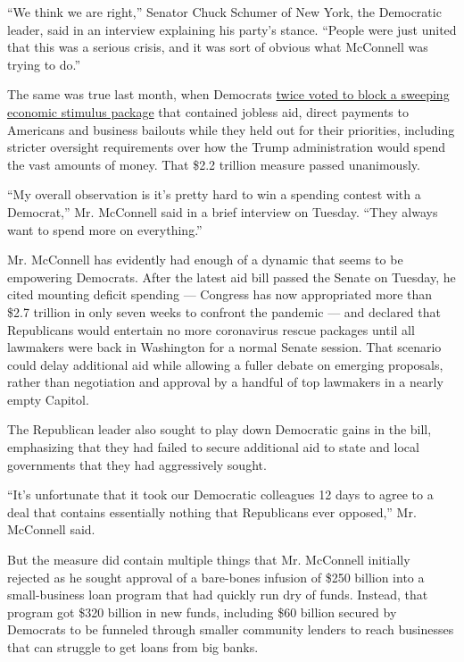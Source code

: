 ``We think we are right,'' Senator Chuck Schumer of New York, the
Democratic leader, said in an interview explaining his party's stance.
``People were just united that this was a serious crisis, and it was
sort of obvious what McConnell was trying to do.''

The same was true last month, when Democrats
\href{https://www.nytimes.com/2020/03/26/us/coronavirus-senate-stimulus-package.html}{twice
voted to block a sweeping economic stimulus package} that contained
jobless aid, direct payments to Americans and business bailouts while
they held out for their priorities, including stricter oversight
requirements over how the Trump administration would spend the vast
amounts of money. That \$2.2 trillion measure passed unanimously.

``My overall observation is it's pretty hard to win a spending contest
with a Democrat,'' Mr. McConnell said in a brief interview on Tuesday.
``They always want to spend more on everything.''

Mr. McConnell has evidently had enough of a dynamic that seems to be
empowering Democrats. After the latest aid bill passed the Senate on
Tuesday, he cited mounting deficit spending --- Congress has now
appropriated more than \$2.7 trillion in only seven weeks to confront
the pandemic --- and declared that Republicans would entertain no more
coronavirus rescue packages until all lawmakers were back in Washington
for a normal Senate session. That scenario could delay additional aid
while allowing a fuller debate on emerging proposals, rather than
negotiation and approval by a handful of top lawmakers in a nearly empty
Capitol.

The Republican leader also sought to play down Democratic gains in the
bill, emphasizing that they had failed to secure additional aid to state
and local governments that they had aggressively sought.

``It's unfortunate that it took our Democratic colleagues 12 days to
agree to a deal that contains essentially nothing that Republicans ever
opposed,'' Mr. McConnell said.

But the measure did contain multiple things that Mr. McConnell initially
rejected as he sought approval of a bare-bones infusion of \$250 billion
into a small-business loan program that had quickly run dry of funds.
Instead, that program got \$320 billion in new funds, including \$60
billion secured by Democrats to be funneled through smaller community
lenders to reach businesses that can struggle to get loans from big
banks.

